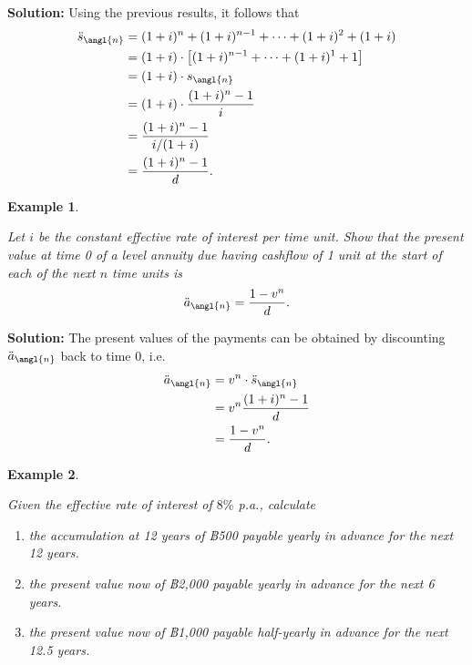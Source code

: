 \documentclass[landscape, 20pt]{extreport}
\theoremstyle{definition}
\theoremstyle{definition}
\newtheorem{example}{Example}[chapter]
\theoremstyle{definition}
\theoremstyle{definition}
\theoremstyle{remark}
\begin{document}
\textbf{Solution:} Using the previous results, it follows that
\[\begin{aligned}
 \ddot{s}_\angl{n} &= (1+i)^n + (1+i)^{n-1} + \cdots + (1+i)^2 + (1+i) \\
            &= (1+i) \cdot \left[(1+i)^{n-1} + \cdots + (1+i)^1 + 1\right] \\
            &= (1+i) \cdot {s}_\angl{n} \\
            &= (1+i) \cdot \frac{(1+i)^n -1 }{i}\\
            &=  \frac{(1+i)^n -1 }{i/(1+i)}\\
            &=  \frac{(1+i)^n -1 }{d}.\end{aligned}\]

\newpage \begin{example}
\protect\hypertarget{exm:unlabeled-div-24}{}\label{exm:unlabeled-div-24}

\emph{Let \(i\) be the constant effective rate of interest
per time unit. Show that the present value at time 0 of a level annuity
due having cashflow of 1 unit at the start of each of the next \(n\) time
units is \[\ddot{a}_\angl{n} =  \frac{1 - v^n }{d}.\]}

\end{example}

\textbf{Solution:} The present values of the payments can be obtained by
discounting \(\ddot{a}_\angl{n}\) back to time 0, i.e.~\[\begin{aligned}
 \ddot{a}_\angl{n} &= v^n  \cdot  \ddot{s}_\angl{n} \\
            &= v^n  \frac{(1+i)^n -1 }{d} \\
            &=\frac{1 - v^n}{d}.\end{aligned}\]

\newpage \begin{example}
\protect\hypertarget{exm:unlabeled-div-25}{}\label{exm:unlabeled-div-25}

\emph{Given the effective rate of interest of \(8\%\) p.a.,
calculate}

\begin{enumerate}
\def\labelenumi{\arabic{enumi}.}
\item
  \emph{the accumulation at 12 years of ฿500 payable yearly in advance for
  the next 12 years.}
\item
  \emph{the present value now of ฿2,000 payable yearly in advance for the
  next 6 years.}
\item
  \emph{the present value now of ฿1,000 payable half-yearly in advance for
  the next 12.5 years.}
\end{enumerate}

\end{example}
\end{document}
